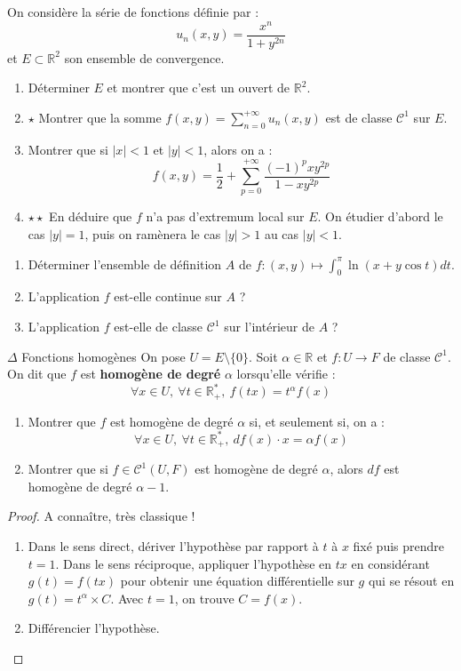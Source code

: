 \documentclass[french,a4paper]{article}
\newcommand{\R}{\mathbb{R}}
\newcommand{\st}{^*}
\theoremstyle{plain}
\theoremstyle{definition}
\theoremstyle{remark}
\begin{document}
\begin{ex}[Moulin.CD.07]{}
	On considère la série de fonctions définie par : $$u_n(x,y)=\frac{x^n}{1+y^{2n}}$$ et $E\subset\R^2$ son ensemble de convergence.
	\begin{enumerate}
		\item Déterminer $E$ et montrer que c'est un ouvert de $\R^2$.
		\item $\star$ Montrer que la somme $f(x,y)=\displaystyle\sum_{n=0}^{+\infty}u_n(x,y)$ est de classe $\mathcal{C}^1$ sur $E$.
		\item Montrer que si $\lvert x\rvert<1$ et $\lvert y\rvert<1$, alors on a : $$f(x,y)=\frac{1}{2}+\sum_{p=0}^{+\infty}\frac{(-1)^pxy^{2p}}{1-xy^{2p}}$$
		\item $\star\star$ En déduire que $f$ n'a pas d'extremum local sur $E$. On étudier d'abord le cas $\lvert y\rvert=1$, puis on ramènera le cas $\lvert y\rvert>1$ au cas $\lvert y\rvert <1$.
	\end{enumerate}
\end{ex}

\begin{ex}[Moulin.CD.08]{}
	\begin{enumerate}
		\item Déterminer l'ensemble de définition $A$ de $f:(x,y)\mapsto\displaystyle\int_{0}^{\pi}\ln(x+y\cos t)dt$.
		\item L'application $f$ est-elle continue sur $A$ ?
		\item L'application $f$ est-elle de classe $\mathcal{C}^1$ sur l'intérieur de $A$ ?
	\end{enumerate}
\end{ex}

\begin{ex}[Moulin.CD.09]{$\Delta$ Fonctions homogènes}
	On pose $U=E\setminus\{0\}$. Soit $\alpha\in\R$ et $f:U\to F$ de classe $\mathcal{C}^1$. On dit que $f$ est \textbf{homogène de degré} $\alpha$ lorsqu'elle vérifie : $$\forall x\in U,\ \forall t\in\R_+\st,\ f(tx)=t^\alpha f(x)$$
	\begin{enumerate}
		\item Montrer que $f$ est homogène de degré $\alpha$ si, et seulement si, on a : $$\forall x\in U,\ \forall t\in\R_+\st,\ df(x)\cdot x=\alpha f(x)$$
		\item Montrer que si $f\in\mathcal{C}^1(U,F)$ est homogène de degré $\alpha$, alors $df$ est homogène de degré $\alpha-1$.
	\end{enumerate} 
\end{ex}
\begin{proof}
	A connaître, très classique !
	\begin{enumerate}
		\item Dans le sens direct, dériver l'hypothèse par rapport à $t$ à $x$ fixé puis prendre $t=1$. Dans le sens réciproque, appliquer l'hypothèse en $tx$ en considérant $g(t)=f(tx)$ pour obtenir une équation différentielle sur $g$ qui se résout en $g(t)=t^\alpha\times C$. Avec $t=1$, on trouve $C=f(x)$.
		\item Différencier l'hypothèse.
	\end{enumerate}
\end{proof}
\end{document}
